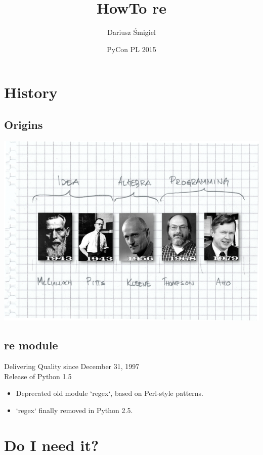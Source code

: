 \documentclass{beamer}
\title{HowTo re}
\author{Dariusz Śmigiel}
\date{PyCon PL 2015}
\begin{document}
\begin{frame}
\titlepage
\end{frame}

\section{History}
\subsection{Origins}
\begin{frame}
\includegraphics[width=1\textwidth]{images/history.png}
\end{frame}

\subsection{re module}
\begin{frame}
Delivering Quality since December 31, 1997 \\
\pause
Release of Python 1.5
\pause

\begin{itemize}
 \item Deprecated old module `regex`, based on Perl-style patterns.
\pause
 \item `regex` finally removed in Python 2.5.
\end{itemize}
\end{frame}

\section{Do I need it?}
\end{document}
